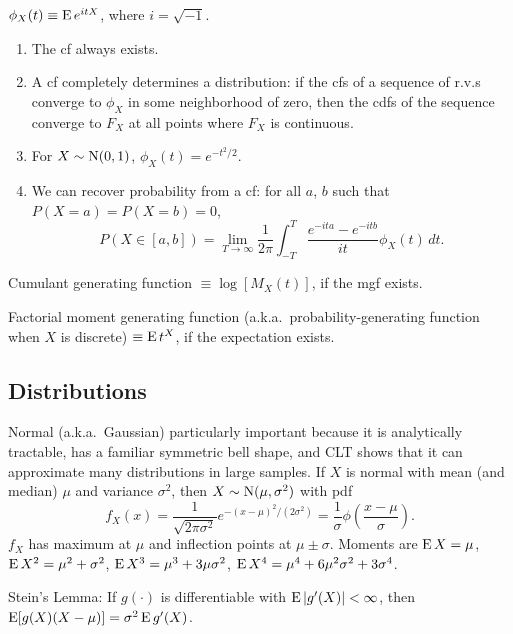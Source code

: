 \documentclass[8pt,letterpaper, landscape]{extarticle} %
\renewcommand{\ln}{\log}
\begin{document}
\begin{multicols}{3}
\begin{description}
 $ \phi_X (t) \equiv \operatorname{E} e^{itX} $, where $ i = \sqrt{-1} $.
\begin{enumerate}
\item The cf always exists.
\item A cf completely determines a distribution: if the cfs of a sequence of r.v.s converge to $ \phi_X $ in some neighborhood of zero, then the cdfs of the sequence converge to $ F_X $ at all points where $ F_X $ is continuous.
\item For $ X \sim \operatorname{N} (0,1) $, $ \phi_X (t) = e^{-t^2 /2} $.
\item We can recover probability from a cf: for all $ a $, $ b $ such that $ P(X=a) = P(X=b) = 0 $,
$$ P (X \in [a,b]) = \lim_{T \to \infty} \frac{1}{2\pi} \int_{-T}^{T} \frac{e^{-ita} - e^{-itb}}{it} \phi_X (t) \, dt. $$
\end{enumerate}

 Cumulant generating function $ \equiv \ln [M_X(t)] $, if the mgf exists.

Factorial moment generating function (a.k.a.\ probability-generating function when $ X $ is discrete) $ \equiv \operatorname{E} t^X $, if the expectation exists.

\subsection{Distributions}
 Normal (a.k.a.\ Gaussian) particularly important because it is analytically tractable, has a familiar symmetric bell shape, and CLT shows that it can approximate many distributions in large samples. If $ X $ is normal with mean (and median) $ \mu $ and variance $ \sigma^2 $, then $ X \sim \operatorname{N} (\mu, \sigma^2) $ with pdf
$$ f_X(x) = \frac{1}{\sqrt{2 \pi \sigma^2}} e^{-(x-\mu)^2/(2 \sigma^2)} = \frac{1}{\sigma} \phi \left( \frac{x - \mu}{\sigma} \right). $$
$ f_X $ has maximum at $ \mu $ and inflection points at $ \mu \pm \sigma $. Moments are $ \operatorname{E} X = \mu $, $ \operatorname{E} X^2 = \mu^2 + \sigma^2 $, $ \operatorname{E} X^3 = \mu^3 + 3 \mu \sigma^2 $, $ \operatorname{E} X^4 = \mu^4 + 6 \mu^2 \sigma^2 + 3 \sigma^4 $.

Stein's Lemma: If $ g(\cdot) $ is differentiable with $ \operatorname{E} | g'(X)| < \infty $, then $ \operatorname{E} [g(X)(X - \mu)] = \sigma^2 \operatorname{E} g'(X) $.


\end{description}
\end{multicols}
\end{document}
